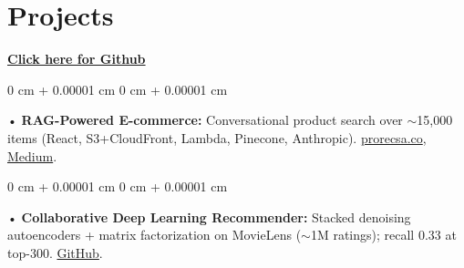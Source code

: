 \documentclass[10pt, letterpaper]{article}
\newenvironment{onecolentry}{
    \begin{adjustwidth}{
        0 cm + 0.00001 cm
    }{
        0 cm + 0.00001 cm
    }
}{
    \end{adjustwidth}
} %
\begin{document}
\section{Projects}
    \vspace{2 pt}
\textbf{\href{https://github.com/daedalus-s}{Click here for Github}}
\begin{onecolentry}
     • \textbf{RAG-Powered E-commerce:} Conversational product search over $\sim$15,000 items (React, S3+CloudFront, Lambda, Pinecone, Anthropic). \href{https://prorecsa.co}{prorecsa.co}, \href{https://medium.com/@sreenikethaathreya/from-rags-to-riches-bba8a671d5e6}{Medium}.
\end{onecolentry}
\begin{onecolentry}
     • \textbf{Collaborative Deep Learning Recommender:} Stacked denoising autoencoders + matrix factorization on MovieLens ($\sim$1M ratings); recall 0.33 at top-300. \href{https://github.com/daedalus-s/MovieRecommendationCDL}{GitHub}.
\end{onecolentry}
\vspace{2 pt}
        \vspace{2 pt }
\end{document}
